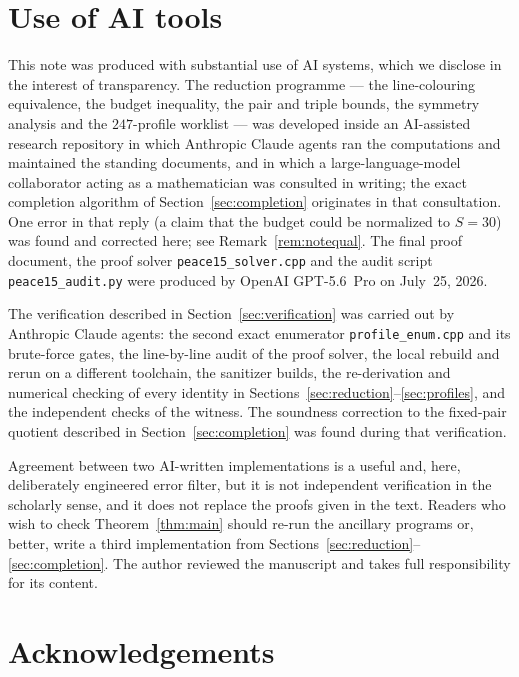 \documentclass[11pt]{amsart}
\theoremstyle{remark}
\begin{document}
\section{Use of AI tools}\label{sec:ai}

This note was produced with substantial use of AI systems, which we disclose in the interest of transparency. The reduction programme --- the line-colouring equivalence, the budget inequality, the pair and triple bounds, the symmetry analysis and the $247$-profile worklist --- was developed inside an AI-assisted research repository in which Anthropic Claude agents ran the computations and maintained the standing documents, and in which a large-language-model collaborator acting as a mathematician was consulted in writing; the exact completion algorithm of Section~\ref{sec:completion} originates in that consultation. One error in that reply (a claim that the budget could be normalized to $S=30$) was found and corrected here; see Remark~\ref{rem:notequal}. The final proof document, the proof solver \texttt{peace15\_solver.cpp} and the audit script \texttt{peace15\_audit.py} were produced by OpenAI GPT-5.6~Pro on July~25, 2026.

The verification described in Section~\ref{sec:verification} was carried out by Anthropic Claude agents: the second exact enumerator \texttt{profile\_enum.cpp} and its brute-force gates, the line-by-line audit of the proof solver, the local rebuild and rerun on a different toolchain, the sanitizer builds, the re-derivation and numerical checking of every identity in Sections~\ref{sec:reduction}--\ref{sec:profiles}, and the independent checks of the witness. The soundness correction to the fixed-pair quotient described in Section~\ref{sec:completion} was found during that verification.

Agreement between two AI-written implementations is a useful and, here, deliberately engineered error filter, but it is not independent verification in the scholarly sense, and it does not replace the proofs given in the text. Readers who wish to check Theorem~\ref{thm:main} should re-run the ancillary programs or, better, write a third implementation from Sections~\ref{sec:reduction}--\ref{sec:completion}. The author reviewed the manuscript and takes full responsibility for its content.

\section*{Acknowledgements}
\end{document}
